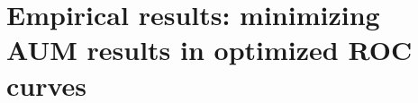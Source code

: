 \documentclass[t]{beamer}
\begin{document}
\section{Empirical results: minimizing AUM results in optimized ROC curves}






    

\end{document}
